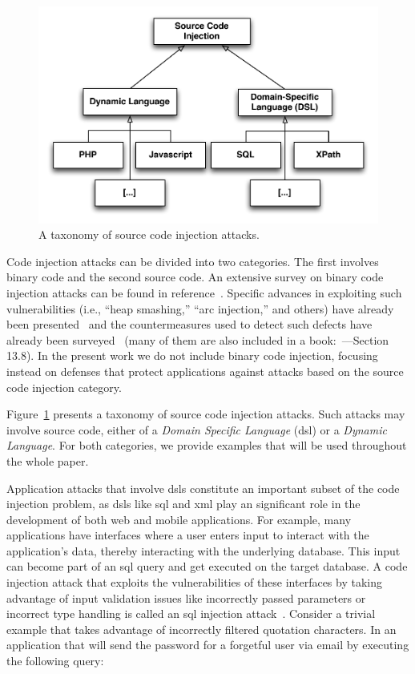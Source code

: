 \documentclass[conference]{IEEEtran}
\begin{document}
\begin{figure}
\begin{center}
\leavevmode
\includegraphics[scale=0.47]{attack-tree-uml.pdf}
\end{center}
\caption{\label{fig:taxonomy}A taxonomy of source
code injection attacks.}
\end{figure}

Code injection attacks can be divided into two categories. The first
involves binary code and the second source code. An
extensive survey on binary code injection attacks can be found
in reference~\cite{LC03}. Specific advances in exploiting such vulnerabilities
(i.e., ``heap smashing,'' ``arc injection,'' and others) have already
been presented~\cite{PB04} and the countermeasures used to detect such
defects have already been surveyed~\cite{YJP12} (many of them are also
included in a book:~\cite{DKZ12}---Section 13.8). In the present work
we do not include binary code injection, focusing instead on defenses
that protect applications against attacks based on the
source code injection category.

Figure~\ref{fig:taxonomy} presents a taxonomy of source
code injection attacks. Such attacks may involve source code, either of a
{\it Domain Specific Language} ({\sc dsl}) or a {\it Dynamic Language}.
For both categories, we provide examples that will be used
throughout the whole paper.

Application attacks that involve {\sc dsl}s constitute an important
subset of the code injection problem, as {\sc dsl}s like {\sc sql} and
{\sc xml} play an significant role in the development of both web and
mobile applications. For example, many applications have interfaces
where a user enters input to interact with the application's data,
thereby interacting with the underlying database. This input can
become part of an {\sc sql} query and get executed on the target
database. A code injection attack that exploits the vulnerabilities of
these interfaces by taking advantage of input validation issues like
incorrectly passed parameters or incorrect type handling is called an
{\sc sql} injection attack~\cite{CERT02,MS09,HVO06,SW06}.
Consider a trivial example that takes advantage of incorrectly
filtered quotation characters. In an application that
will send the password for a forgetful user via email by executing the
following query:
\end{document}
